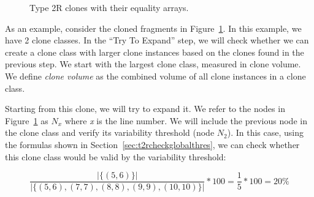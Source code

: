 \begin{figure}[H]
\begin{parcolumns}{2}
\end{parcolumns}
\caption{Type 2R clones with their equality arrays.}
\label{fig:trytoexpand}
\end{figure}

As an example, consider the cloned fragments in Figure~\ref{fig:trytoexpand}. In this example, we have 2 clone classes. In the ``Try To Expand'' step, we will check whether we can create a clone class with larger clone instances based on the clones found in the previous step. We start with the largest clone class, measured in clone volume. We define \textit{clone volume} as the combined volume of all clone instances in a clone class.



Starting from this clone, we will try to expand it. We refer to the nodes in Figure~\ref{fig:trytoexpand} as $N_x$ where \textit{x} is the line number. We will include the previous node in the clone class and verify its variability threshold (node $N_2$). In this case, using the formulas shown in Section~\ref{sec:t2rcheckglobalthres}, we can check whether this clone class would be valid by the variability threshold:

\begin{equation}\label{eq:variabilitycombined1}
\frac{|\{(5,6)\}|}{|\{(5,6),(7,7),(8,8),(9,9),(10,10)\}|}*100 = \frac{1}{5}*100 = 20\%
\end{equation}

